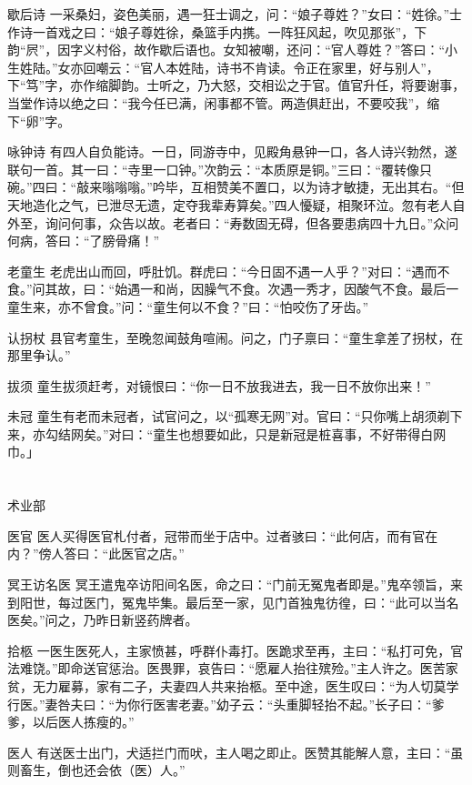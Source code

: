 \documentclass[12pt,UTF8]{ctexbook}
\begin{document}
歇后诗
一采桑妇，姿色美丽，遇一狂士调之，问：“娘子尊姓？”女曰：“姓徐。”士作诗一首戏之曰：“娘子尊姓徐，桑篮手内携。一阵狂风起，吹见那张”，下韵“屄”，因字义村俗，故作歇后语也。女知被嘲，还问：“官人尊姓？”答曰：“小生姓陆。”女亦回嘲云：“官人本姓陆，诗书不肯读。令正在家里，好与别人”，下“笃”字，亦作缩脚韵。士听之，乃大怒，交相讼之于官。值官升任，将要谢事，当堂作诗以绝之曰：“我今任已满，闲事都不管。两造俱赶出，不要咬我”，缩下“卵”字。

咏钟诗
有四人自负能诗。一日，同游寺中，见殿角悬钟一口，各人诗兴勃然，遂联句一首。其一曰：“寺里一口钟。”次韵云：“本质原是铜。”三曰：“覆转像只碗。”四曰：“敲来嗡嗡嗡。”吟毕，互相赞美不置口，以为诗才敏捷，无出其右。“但天地造化之气，已泄尽无遗，定夺我辈寿算矣。”四人懮疑，相聚环泣。忽有老人自外至，询问何事，众告以故。老者曰：“寿数固无碍，但各要患病四十九日。”众问何病，答曰：“了膀骨痛！”

老童生
老虎出山而回，呼肚饥。群虎曰：“今日固不遇一人乎？”对曰：“遇而不食。”问其故，曰：“始遇一和尚，因臊气不食。次遇一秀才，因酸气不食。最后一童生来，亦不曾食。”问：“童生何以不食？”曰：“怕咬伤了牙齿。”

认拐杖
县官考童生，至晚忽闻鼓角喧闹。问之，门子禀曰：“童生拿差了拐杖，在那里争认。”

拔须
童生拔须赶考，对镜恨曰：“你一日不放我进去，我一日不放你出来！”

未冠
童生有老而未冠者，试官问之，以“孤寒无网”对。官曰：“只你嘴上胡须剃下来，亦勾结网矣。”对曰：“童生也想要如此，只是新冠是桩喜事，不好带得白网巾。」

\part{}

术业部

医官
医人买得医官札付者，冠带而坐于店中。过者骇曰：“此何店，而有官在内？”傍人答曰：“此医官之店。”

冥王访名医
冥王遣鬼卒访阳间名医，命之曰：“门前无冤鬼者即是。”鬼卒领旨，来到阳世，每过医门，冤鬼毕集。最后至一家，见门首独鬼彷徨，曰：“此可以当名医矣。”问之，乃昨日新竖药牌者。

拾柩
一医生医死人，主家愤甚，呼群仆毒打。医跪求至再，主曰：“私打可免，官法难饶。”即命送官惩治。医畏罪，哀告曰：“愿雇人抬往殡殓。”主人许之。医苦家贫，无力雇募，家有二子，夫妻四人共来抬柩。至中途，医生叹曰：“为人切莫学行医。”妻咎夫曰：“为你行医害老妻。”幼子云：“头重脚轻抬不起。”长子曰：“爹爹，以后医人拣瘦的。”

医人
有送医士出门，犬适拦门而吠，主人喝之即止。医赞其能解人意，主曰：“虽则畜生，倒也还会依（医）人。”
\end{document}

